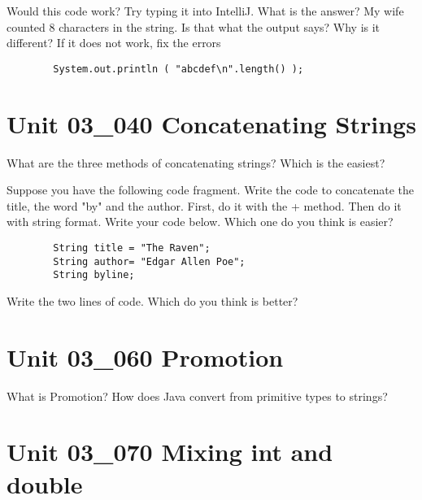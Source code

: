 \documentclass[letterpaper,12pt]{exam}
\newcommand{\unit}{Unit 03}
\begin{document}
\begin{questions}
\begin{samepage}
	\question Would this code work?  Try typing it into IntelliJ. What is the answer?  My wife counted 8 characters in the string.  Is that what the output says?  Why is it different?  If it does not work, fix the errors
	\begin{verbatim}
		System.out.println ( "abcdef\n".length() );
	\end{verbatim}
	\vspace{5mm}
\end{samepage}

\section*{\unit\_040 Concatenating Strings} %

\begin{samepage}
	\question What are the three methods of concatenating strings?  Which is the easiest?
	\vspace{5mm}
\end{samepage}

\begin{samepage}
	\question Suppose you have the following code fragment.  Write the code to concatenate the title, the word "by" and the author.  First, do it with the + method.  Then do it with string format.  Write your code below.  Which one do you think is easier?
	\begin{verbatim}
		String title = "The Raven";
		String author= "Edgar Allen Poe";
		String byline;
	\end{verbatim}
	Write the two lines of code.  Which do you think is better?
	\vspace{25mm}
\end{samepage}
\section*{\unit\_060 Promotion} %

\begin{samepage}
	\question What is Promotion?  How does Java convert from primitive types to strings?
	\vspace{5mm}
\end{samepage}

\section*{\unit\_070 Mixing int and double} %


\end{questions}
\end{document}

